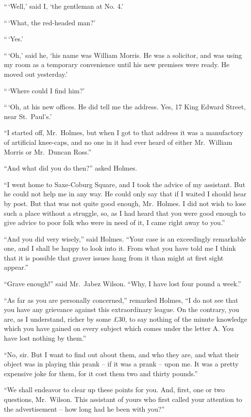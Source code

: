 “\,‘Well,’ said I, ‘the gentleman at No. 4.’

“\,‘What, the red-headed man?’

“\,‘Yes.’

“\,‘Oh,’ said he, ‘his name was William Morris. He was a
solicitor, and was using my room as a temporary convenience
until his new premises were ready. He moved out yesterday.’

“\,‘Where could I find him?’

“\,‘Oh, at his new offices. He did tell me the address. Yes,
17 King Edward Street, near St.~Paul’s.’

“I started off, Mr.~Holmes, but when I got to that address
it was a manufactory of artificial knee-caps, and no one in it
had ever heard of either Mr.~William Morris or Mr.~Duncan
Ross.”

“And what did you do then?” asked Holmes.

“I went home to Saxe-Coburg Square, and I took the advice
of my assistant. But he could not help me in any way.
He could only say that if I waited I should hear by post.
But that was not quite good enough, Mr.~Holmes. I did not
wish to lose such a place without a struggle, so, as I had
heard that you were good enough to give advice to poor folk
who were in need of it, I came right away to you.”

“And you did very wisely,” said Holmes. “Your case is
an exceedingly remarkable one, and I shall be happy to look
into it. From what you have told me I think that it is possible
that graver issues hang from it than might at first sight
appear.”

“Grave enough!” said Mr.~Jabez Wilson. “Why, I have
lost four pound a week.”

“As far as you are personally concerned,” remark\-ed Hol\-mes,
“I do not see that you have any grievance against this extraordinary
league. On the contrary, you are, as I understand,
richer by some £30, to say nothing of the minute knowledge
which you have gained on every subject which comes
under the letter A. You have lost nothing by them.”

“No, sir. But I want to find out about them, and who
they are, and what their object was in playing this prank -- if
it was a prank -- upon me. It was a pretty expensive joke for
them, for it cost them two and thirty pounds.”

“We shall endeavor to clear up these points for you. And,
first, one or two questions, Mr.~Wilson. This assistant of
yours who first called your attention to the advertisement -- how
long had he been with you?”

